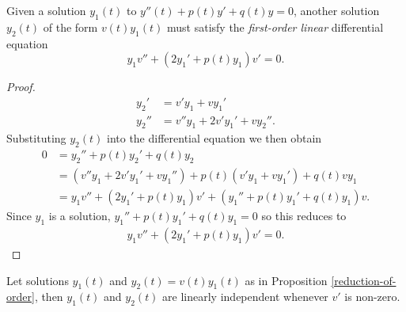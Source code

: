 \begin{prop}\label{reduction-of-order}
    Given a solution $y_1(t)$ to $y''(t) + p(t)y' + q(t)y = 0$, another solution $y_2(t)$ of the form $v(t)y_1(t)$ must satisfy the \emph{first-order linear} differential equation
    \[y_1v'' + \left(2y_1' + p(t)y_1\right)v' = 0.\]
\end{prop}

\begin{proof}
    \begin{align*}
        y_2' &= v'y_1 + vy_1' \\
        y_2'' &= v''y_1 + 2v'y_1' + vy_2''.
    \end{align*}
    Substituting $y_2(t)$ into the differential equation we then obtain
    \begin{align*}
        0 &= y_2'' + p(t)y_2' + q(t)y_2 \\
        &= \left(v''y_1 + 2v'y_1' + vy_1''\right) + p(t)\left(v'y_1 + vy_1'\right) + q(t)vy_1 \\
        &= y_1v'' + \left(2y_1' + p(t)y_1\right)v' + \left(y_1'' + p(t)y_1' + q(t)y_1\right)v.
    \end{align*}
    Since $y_1$ is a solution, $y_1'' + p(t)y_1' + q(t)y_1 = 0$ so this reduces to
    \begin{align*}
        y_1v'' + \left(2y_1' + p(t)y_1\right)v' = 0.
    \end{align*}
\end{proof}

\begin{prop}
    Let solutions $y_1(t)$ and $y_2(t) = v(t)y_1(t)$ as in Proposition \ref{reduction-of-order}, then $y_1(t)$ and $y_2(t)$ are linearly independent whenever $v'$ is non-zero.
\end{prop}

